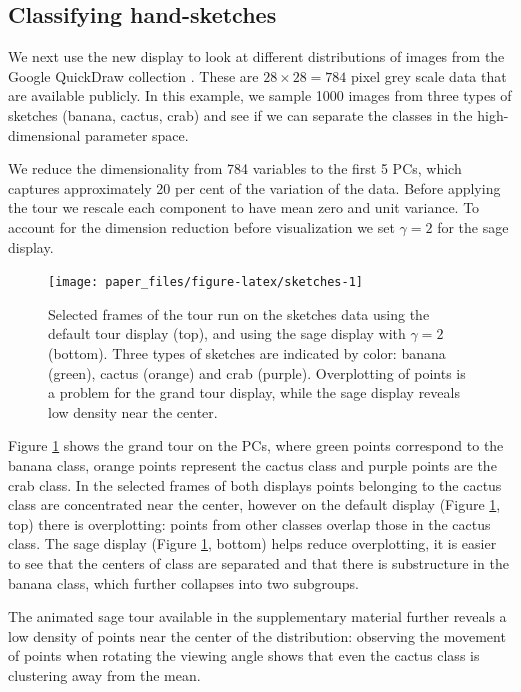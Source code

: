 \documentclass[]{interact}
\theoremstyle{plain}%
\theoremstyle{definition}
\theoremstyle{remark}
\begin{document}
\hypertarget{sec:appl2}{%
\subsection{Classifying hand-sketches}\label{sec:appl2}}

We next use the new display to look at different distributions of images
from the Google QuickDraw collection \citep{quickdraw-paper}. These are
\(28\times28=784\) pixel grey scale data that are available publicly. In
this example, we sample 1000 images from three types of sketches
(banana, cactus, crab) and see if we can separate the classes in the
high-dimensional parameter space.

We reduce the dimensionality from 784 variables to the first 5 PCs,
which captures approximately 20 per cent of the variation of the data.
Before applying the tour we rescale each component to have mean zero and
unit variance. To account for the dimension reduction before
visualization we set \(\gamma=2\) for the sage display.

\begin{figure}

{\centering \texttt{[image: paper\_files/figure-latex/sketches-1]} 

}

\caption{Selected frames  of the tour run on the sketches data using the default tour display (top), and using the sage display with $\gamma=2$ (bottom). Three types of sketches are indicated by color: banana (green), cactus (orange) and crab (purple). Overplotting of points is a problem for the grand tour display, while the sage display reveals low density near the center.}\label{fig:sketches}
\end{figure}

Figure \ref{fig:sketches} shows the grand tour on the PCs, where green
points correspond to the banana class, orange points represent the
cactus class and purple points are the crab class. In the selected
frames of both displays points belonging to the cactus class are
concentrated near the center, however on the default display (Figure
\ref{fig:sketches}, top) there is overplotting: points from other
classes overlap those in the cactus class. The sage display (Figure
\ref{fig:sketches}, bottom) helps reduce overplotting, it is easier to
see that the centers of class are separated and that there is
substructure in the banana class, which further collapses into two
subgroups.

The animated sage tour available in the supplementary material further
reveals a low density of points near the center of the distribution:
observing the movement of points when rotating the viewing angle shows
that even the cactus class is clustering away from the mean.
\end{document}

